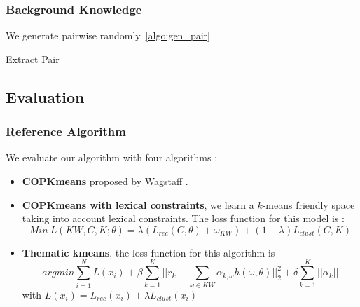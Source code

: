 \subsubsection{Background Knowledge}
We generate pairwise randomly~\ref{algo:gen_pair}
\begin{algorithm}[!h]
  \caption{\label{algo:gen_pair}Extract Pair}
\end{algorithm}
\subsection{Evaluation}
\subsubsection{Reference Algorithm}
We evaluate our algorithm with four algorithms :
\begin{itemize}
\item \textbf{COPKmeans} proposed by Wagstaff \cite{Wagstaff:2001:CKC:645530.655669}.
\item \textbf{COPKmeans with lexical constraints}, we learn a $k$-means
  friendly space taking into account lexical constraints. The loss
  function for this model is :
  $$
  Min~L(KW, C, K; \theta) = \lambda(L_{rec}(C, \theta) + \omega_{KW} )+
  (1-\lambda)L_{clust}(C,K)
  $$
\item \textbf{Thematic kmeans}, the loss function for this algorithm is
  \begin{equation*}
    argmin \sum_{i=1}^{N}L(x_i) + \beta\sum_{k=1}^{K}||r_k - \sum_{\omega \in KW}
    \alpha_{k,\omega}h(\omega, \theta)||_2^2 + \delta\sum_{k=1}^{K}||\alpha_k|| 
  \end{equation*}
  with $L(x_i) = L_{rec}(x_i) + \lambda L_{clust}(x_i)$
\end{itemize}
